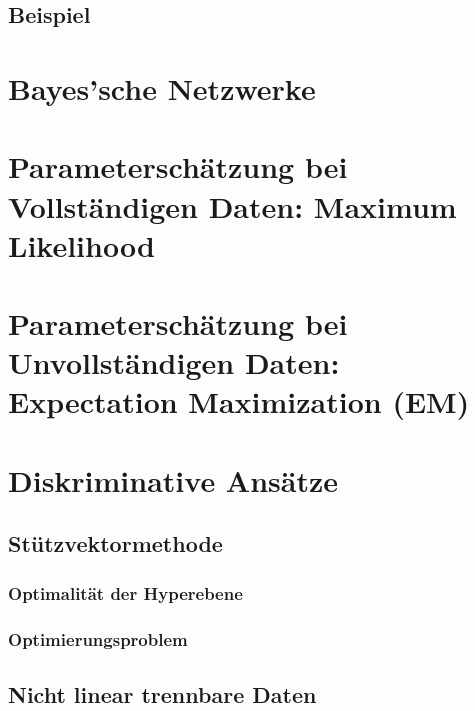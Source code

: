 		\subsection{Beispiel} %

	\section{Bayes'sche Netzwerke} %

	\section{Parameterschätzung bei Vollständigen Daten: Maximum Likelihood} %

	\section{Parameterschätzung bei Unvollständigen Daten: Expectation Maximization (EM)} %

	\section{Diskriminative Ansätze} %

		\subsection{Stützvektormethode} %

			\subsubsection{Optimalität der Hyperebene} %

			\subsubsection{Optimierungsproblem} %

		\subsection{Nicht linear trennbare Daten} %

